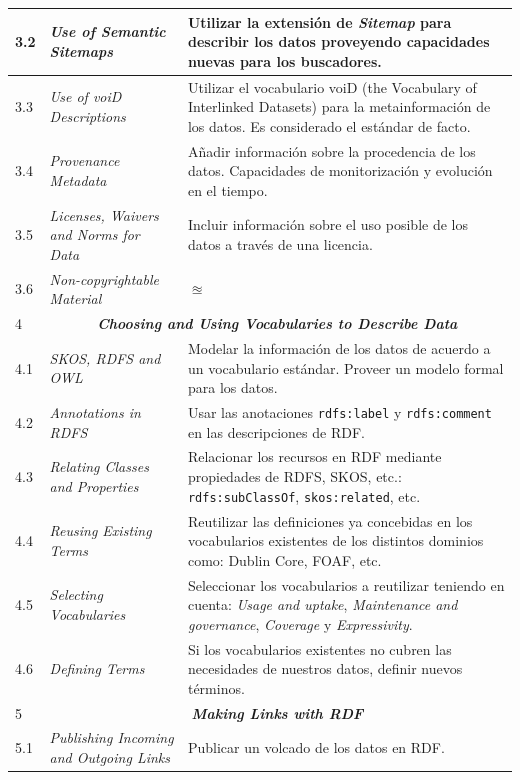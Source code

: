 \begin{longtable}[c]{|l|p{7cm}|p{8cm}|}
   3.2 &  \textit{Use of Semantic Sitemaps} & Utilizar la extensión de \textit{Sitemap} para describir los datos proveyendo capacidades nuevas para los buscadores. \\ \hline
   3.3 &  \textit{Use of voiD Descriptions} & Utilizar el vocabulario voiD (the Vocabulary of Interlinked Datasets) para la metainformación de los datos. Es considerado el estándar de facto. \\ \hline
   3.4 &  \textit{Provenance Metadata} & Añadir información sobre la procedencia de los datos. Capacidades de monitorización y evolución en el tiempo. \\ \hline
   3.5 &  \textit{Licenses, Waivers and Norms for Data} & Incluir información sobre el uso posible de los datos a través de una licencia. \\ \hline
   3.6 &  \textit{Non-copyrightable Material} & $\approxeq$ \\ \hline
   4&\multicolumn{2}{|c|}{\textbf{\textit{Choosing and Using Vocabularies to Describe Data}}}\\ \hline
   4.1 &  \textit{\gls{SKOS}, RDFS and \gls{OWL}} &  Modelar la información de los datos de acuerdo a un vocabulario estándar. Proveer un modelo formal para los datos.\\ \hline
   4.2 &  \textit{Annotations in RDFS} &  Usar las anotaciones \texttt{rdfs:label} y \texttt{rdfs:comment} en las descripciones de RDF.\\ \hline
   4.3 &  \textit{Relating Classes and Properties} &  Relacionar los recursos en RDF mediante propiedades de RDFS, SKOS, etc.: \texttt{rdfs:subClassOf}, \texttt{skos:related}, etc.  \\ \hline
   4.4 &  \textit{Reusing Existing Terms} & Reutilizar las definiciones ya concebidas en los vocabularios existentes de los distintos dominios como: Dublin Core, FOAF, etc. \\ \hline
   4.5 &  \textit{Selecting Vocabularies} & Seleccionar los vocabularios a reutilizar teniendo en cuenta: \textit{Usage and uptake}, \textit{Maintenance and governance}, \textit{Coverage} y \textit{Expressivity}.\\ \hline
   4.6 &  \textit{Defining Terms} &  Si los vocabularios existentes no cubren las necesidades de nuestros datos, definir nuevos términos.\\ \hline
   5&\multicolumn{2}{|c|}{\textbf{\textit{Making Links with RDF}}}\\ \hline
   5.1 &  \textit{Publishing Incoming and Outgoing Links} &  Publicar un volcado de los datos en RDF.\\ \hline

\end{longtable}
